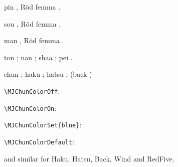 \documentclass[%
  draft,%
  a4paper,11pt,%
]{article}
\begin{document}
{\MJLargeOn
  \noindent
  pin , Röd femma \MJ{\redfive\pin}.\par
  \noindent
  sou , Röd femma \MJ{\redfive\sou}.\par
  \noindent
  man , Röd femma \MJ{\redfive\man}.\par
  \noindent
  ton \MJ\ton; nan \MJ\nan; shaa \MJ\shaa; pei \MJ\pei.\par
  \noindent
  chun \MJ\chun; haku \MJ\haku; hatsu \MJ\hatsu. (back \MJ\back)\par
}

{
  \MJChunColorOff
  \noindent \verb|\MJChunColorOff|: \MJ{\hatsu\chun}\par
  \MJChunColorOn
  \noindent \verb|\MJChunColorOn|: \MJ{\hatsu\chun}\par
  \noindent \verb|\MJChunColorSet{blue}|: \MJ{\hatsu\chun}\par
  \MJChunColorDefault
  \noindent \verb|\MJChunColorDefault|: \MJ{\hatsu\chun}\par
  \noindent and similar for Haku, Hatsu, Back, Wind and RedFive.
}
\end{document}
